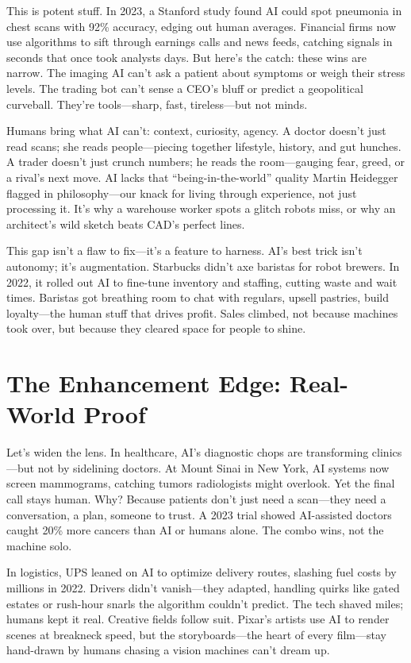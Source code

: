 \documentclass[
  Letterpaper,
]{scrbook}
\begin{document}
This is potent stuff. In 2023, a Stanford study found AI could spot
pneumonia in chest scans with 92\% accuracy, edging out human averages.
Financial firms now use algorithms to sift through earnings calls and
news feeds, catching signals in seconds that once took analysts days.
But here's the catch: these wins are narrow. The imaging AI can't ask a
patient about symptoms or weigh their stress levels. The trading bot
can't sense a CEO's bluff or predict a geopolitical curveball. They're
tools---sharp, fast, tireless---but not minds.

Humans bring what AI can't: context, curiosity, agency. A doctor doesn't
just read scans; she reads people---piecing together lifestyle, history,
and gut hunches. A trader doesn't just crunch numbers; he reads the
room---gauging fear, greed, or a rival's next move. AI lacks that
``being-in-the-world'' quality Martin Heidegger flagged in
philosophy---our knack for living through experience, not just
processing it. It's why a warehouse worker spots a glitch robots miss,
or why an architect's wild sketch beats CAD's perfect lines.

This gap isn't a flaw to fix---it's a feature to harness. AI's best
trick isn't autonomy; it's augmentation. Starbucks didn't axe baristas
for robot brewers. In 2022, it rolled out AI to fine-tune inventory and
staffing, cutting waste and wait times. Baristas got breathing room to
chat with regulars, upsell pastries, build loyalty---the human stuff
that drives profit. Sales climbed, not because machines took over, but
because they cleared space for people to shine.

\section{The Enhancement Edge: Real-World
Proof}\label{the-enhancement-edge-real-world-proof}

Let's widen the lens. In healthcare, AI's diagnostic chops are
transforming clinics---but not by sidelining doctors. At Mount Sinai in
New York, AI systems now screen mammograms, catching tumors radiologists
might overlook. Yet the final call stays human. Why? Because patients
don't just need a scan---they need a conversation, a plan, someone to
trust. A 2023 trial showed AI-assisted doctors caught 20\% more cancers
than AI or humans alone. The combo wins, not the machine solo.

In logistics, UPS leaned on AI to optimize delivery routes, slashing
fuel costs by millions in 2022. Drivers didn't vanish---they adapted,
handling quirks like gated estates or rush-hour snarls the algorithm
couldn't predict. The tech shaved miles; humans kept it real. Creative
fields follow suit. Pixar's artists use AI to render scenes at breakneck
speed, but the storyboards---the heart of every film---stay hand-drawn
by humans chasing a vision machines can't dream up.
\end{document}
